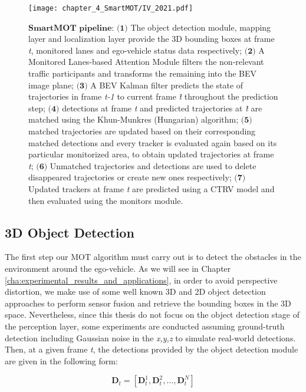 \begin{figure*}[thpb]
	\centering
	\texttt{[image: chapter\_4\_SmartMOT/IV\_2021.pdf]}
	\caption[SmartMOT pipeline]{$\textbf{SmartMOT pipeline}$: $\textbf{(1)}$ The object detection module, mapping layer and localization layer provide the 3D bounding boxes at frame \textit{t}, monitored lanes and ego-vehicle status data respectively; $\textbf{(2)}$ A Monitored Lanes-based Attention Module filters the non-relevant traffic participants and transforms the remaining into the \ac{BEV} image plane; $\textbf{(3)}$ A \ac{BEV} Kalman filter predicts the state of trajectories in frame \textit{t-1} to current frame \textit{\^{t}} throughout the prediction step; $\textbf{(4)}$ detections at frame \textit{t} and predicted trajectories at \textit{\^{t}} are matched using the Khun-Munkres (\aka Hungarian) algorithm; $\textbf{(5)}$ matched trajectories are updated based on their corresponding matched detections and every tracker is evaluated again based on its particular monitorized area, to obtain updated trajectories at frame \textit{{t}}; $\textbf{(6)}$ Unmatched trajectories and detections are used to delete disappeared trajectories or create new ones respectively; $\textbf{(7)}$ Updated trackers at frame \textit{{t}} are predicted using a CTRV model and then evaluated using the monitors module.}
	\label{fig:chapter_4_SmartMOT/IV_2021}
\end{figure*}

\subsection{3D Object Detection}

The first step our \ac{MOT} algorithm must carry out is to detect the obstacles in the environment around the ego-vehicle. As we will see in Chapter \ref{cha:experimental_results_and_applications}, in order to avoid perspective distortion, we make use of some well known 3D and 2D object detection approaches \cite{lang2019pointpillars, redmon2016you} to perform sensor fusion and retrieve the bounding boxes in the 3D space. Nevertheless, since this thesis do not focus on the object detection stage of the perception layer, some experiments are conducted assuming ground-truth detection including Gaussian noise in the \textit{x,y,z} to simulate real-world detections. Then, at a given frame \textit{t}, the detections provided by the object detection module are given in the following form:

\begin{equation}
	\label{eq:5_smartmot_detection}
	\textbf{D}_{t} =[\textbf{D}_{t}^{1},\textbf{D}_{t}^{2}, ...,\textbf{D}_{t}^{N}]
\end{equation}

